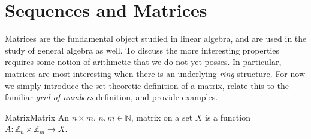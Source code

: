 \section{Sequences and Matrices}
    Matrices are the fundamental object studied in
    linear algebra, and are used in the study of general
    algebra as well. To discuss the more interesting properties requires some
    notion of arithmetic that we do not yet posses. In particular, matrices are
    most interesting when there is an underlying \textit{ring}
    structure. For now we simply introduce the set theoretic definition of a
    matrix, relate this to the familiar \textit{grid of numbers} definition, and
    provide examples.
    \begin{fdefinition}{Matrix}{Matrix}
        An $n\times{m}$, $n,m\in\mathbb{N}$, matrix on a set $X$ is a function
        $A:\mathbb{Z}_{n}\times\mathbb{Z}_{m}\rightarrow{X}$.
    \end{fdefinition}